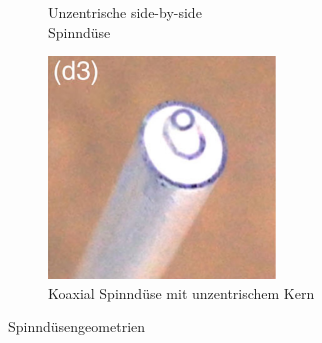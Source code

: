 \begin{figure}[!h]
\begin{subfigure}[]{.285\textwidth}
         \caption{Unzentrische side-by-side \\ Spinndüse}
         \label{fig:acentric_sideby-side}
     \end{subfigure}
     \hspace{5mm}
     \begin{subfigure}[]{.29\textwidth}
        \centering
        \includegraphics[width=\textwidth]{Abbildungen/a_coaxial_spinneret_with_an_acentric_core.png}
         \caption{Koaxial Spinndüse mit  unzentrischem Kern}
         \label{fig:a_coaxial_spinneret_with_an_acentric_core}
     \end{subfigure}
     \caption{Spinndüsengeometrien \cite{Yu.2020}}
      \label{fig:spinnduesengeometrien}
        \end{figure}

